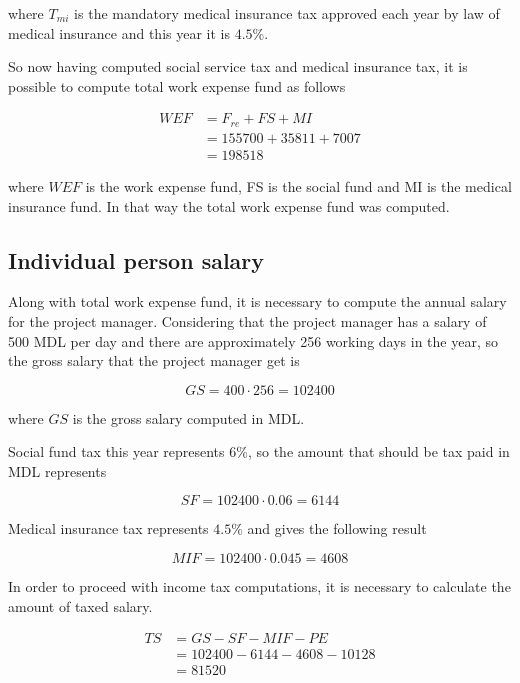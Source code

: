 \noindent
where $T_{mi}$ is the mandatory medical insurance tax approved each year by law of medical insurance and this year it is $4.5\%$. 

So now having computed social service tax and medical insurance tax, it is possible to compute total work expense fund as follows

\begin{equation}
\begin{split}
 WEF &= F_{re} + FS + MI\\
     &= 155700 + 35811 + 7007\\
     &= 198518
\end{split}
\end{equation}

\noindent
where $WEF$ is the work expense fund, FS is the social fund and MI is the medical insurance fund. In that way the total work expense fund was computed.


\subsection{Individual person salary}
Along with total work expense fund, it is necessary to compute the annual salary for the project manager. Considering that the project manager has a salary of 500 MDL per day and there are approximately 256 working days in the year, so the gross salary that the project manager get is

\begin{equation}
 GS = 400 \cdot 256 = 102400
\end{equation}

\noindent where $GS$ is the gross salary computed in MDL.

Social fund tax this year represents $6\%$, so the amount that should be tax paid in MDL represents

\begin{equation}
 SF = 102400 \cdot 0.06 = 6144
\end{equation}

Medical insurance tax represents $4.5\%$ and gives the following result

\begin{equation}
 MIF = 102400 \cdot 0.045 = 4608
\end{equation}

In order to proceed with income tax computations, it is necessary to calculate the amount of taxed salary.

\begin{equation}
\begin{split}
 TS &= GS - SF - MIF - PE \\
              &= 102400 - 6144 - 4608 - 10128\\ 
              &= 81520
\end{split}
\end{equation}

